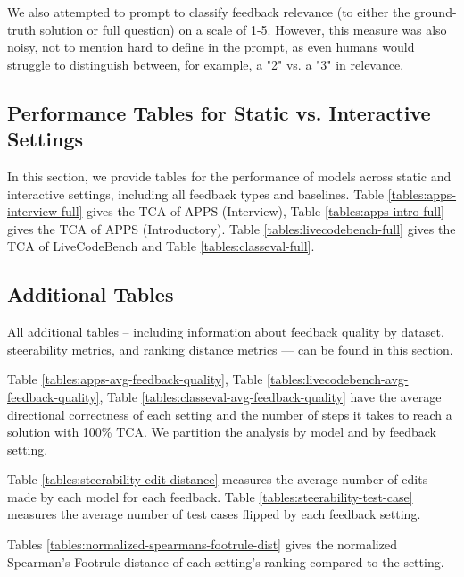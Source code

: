 We also attempted to prompt \gpt{} to classify feedback relevance (to either the ground-truth solution or full question) on a scale of 1-5. 
However, this measure was also noisy, not to mention hard to define in the prompt, as even humans would struggle to distinguish between, for example, a "2" vs. a "3" in relevance.








\subsection{Performance Tables for Static vs. Interactive Settings}
\label{app:full_results}

In this section, we provide tables for the performance of models across static and interactive settings, including all feedback types and baselines.
Table \ref{tables:apps-interview-full} gives the TCA of APPS (Interview), Table \ref{tables:apps-intro-full} gives the TCA of APPS (Introductory). 
Table \ref{tables:livecodebench-full} gives the TCA of LiveCodeBench and Table \ref{tables:classeval-full}.

\subsection{Additional Tables}
All additional tables -- including information about feedback quality by dataset, steerability metrics, and ranking distance metrics --- can be found in this section. 
\label{app:average_feedback_quality_per_step}

Table \ref{tables:apps-avg-feedback-quality}, Table \ref{tables:livecodebench-avg-feedback-quality}, Table \ref{tables:classeval-avg-feedback-quality} have the average directional correctness of each setting and the number of steps it takes to reach a solution with 100\% TCA. We partition the analysis by model and by feedback setting.

Table \ref{tables:steerability-edit-distance} measures the average number of edits made by each model for each feedback. 
Table \ref{tables:steerability-test-case} measures the average number of test cases flipped by each feedback setting.

Tables \ref{tables:normalized-spearmans-footrule-dist} gives the normalized Spearman's Footrule distance of each setting's ranking compared to the \vanilla{} setting.




